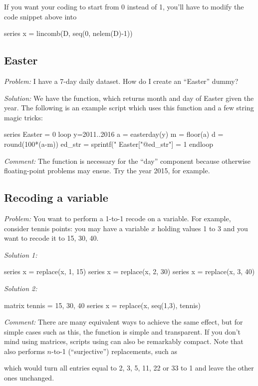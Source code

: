 If you want your coding to start from 0 instead of 1, you'll have to
modify the code snippet above into
\begin{code}
series x = lincomb(D, seq(0, nelem(D)-1))
\end{code}

\subsection{Easter}

\emph{Problem:} I have a 7-day daily dataset. How do I create an
``Easter'' dummy?

\emph{Solution:} We have the  function, which returns
month and day of Easter given the year. The following is an example
script which uses this function and a few string magic tricks:

\begin{code}
series Easter = 0
loop y=2011..2016
    a = easterday(y)
    m = floor(a)
    d = round(100*(a-m))
    ed_str = sprintf("%
    Easter["@ed_str"] = 1
endloop
\end{code}

\emph{Comment:} The  function is necessary for the
``day'' component because otherwise floating-point problems may
ensue. Try the year 2015, for example.

\subsection{Recoding a variable}

\emph{Problem:} You want to perform a 1-to-1 recode on a variable. For
example, consider tennis points: you may have a variable $x$ holding
values 1 to 3 and you want to recode it to 15, 30, 40.

\emph{Solution 1:}
\begin{code}
series x = replace(x, 1, 15)
series x = replace(x, 2, 30)
series x = replace(x, 3, 40)
\end{code}

\emph{Solution 2:}
\begin{code}
matrix tennis = {15, 30, 40}
series x = replace(x, seq(1,3), tennis)
\end{code}

\emph{Comment:} There are many equivalent ways to achieve the same
effect, but for simple cases such as this, the  function
is simple and transparent. If you don't mind using matrices, scripts
using  can also be remarkably compact. Note that
 also performs $n$-to-1 (``surjective'') replacements,
such as
\begin{code}
series x = replace{z, {2, 3, 5, 11, 22, 33}, 1)
\end{code}
which would turn all entries equal to 2, 3, 5, 11, 22 or 33 to 1 and
leave the other ones unchanged.


